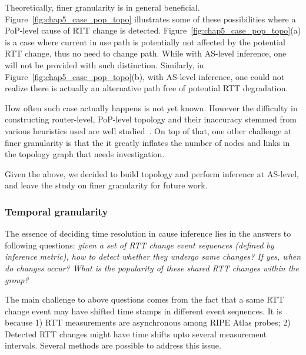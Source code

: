 Theoretically, finer granularity is in general beneficial. Figure~\ref{fig:chap5_case_pop_topo} illustrates some of these possibilities where a PoP-level cause of RTT change is detected.
Figure~\ref{fig:chap5_case_pop_topo}(a) is a case where current in use path is potentially not affected by the potential RTT change, thus no need to change path. While with AS-level inference, one will not be provided with such distinction. 
Similarly, in Figure~\ref{fig:chap5_case_pop_topo}(b), with AS-level inference, one could not realize there is actually an alternative path free of potential RTT degradation.

How often such case actually happens is not yet known. However the difficulty in constructing router-level, PoP-level topology and their inaccuracy stemmed from various heuristics used are well studied~\cite{Donnet2007, shavitt2013internet, fressancourt2016}.
On top of that, one other challenge at finer granularity is that the it greatly inflates the number of nodes and links in the topology graph that needs investigation.

Given the above, we decided to build topology and perform inference at AS-level, and leave the study on finer granularity for future work.

\subsubsection{Temporal granularity}
The essence of deciding time resolution in cause inference lies in the answers to following questions: \textit{given a set of RTT change event sequences (defined by inference metric), how to detect whether they undergo same changes? If yes, when do changes occur? What is the popularity of these shared RTT changes within the group?}

The main challenge to above questions comes from the fact that a same RTT change event may have shifted time stamps in different event sequences. It is because 1) RTT measurements are asynchronous among RIPE Atlas probes; 2) Detected RTT changes might have time shifts upto several measurement intervals.
Several methods are possible to address this issue.


